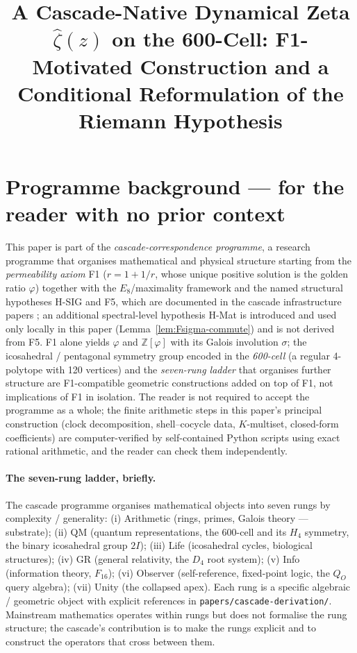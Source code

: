 \documentclass[11pt, a4paper]{amsart}
\title{A Cascade-Native Dynamical Zeta $\widehat\zeta(z)$ on the 600-Cell: F1-Motivated Construction and a Conditional Reformulation of the Riemann Hypothesis}
\author{}
\date{}
\theoremstyle{definition}
\begin{document}
\maketitle

\section*{Programme background — for the reader with no prior context}

This paper is part of the \emph{cascade-correspondence programme},
a research programme that organises mathematical and physical
structure starting from the \emph{permeability axiom} F1
($r = 1 + 1/r$, whose unique positive solution is the golden ratio
$\varphi$) together with the $E_8$/maximality framework and the
named structural hypotheses H-SIG and F5, which are documented in
the cascade infrastructure papers
\cite{CascadeFoundations,PaperXXXVI}; an additional spectral-level
hypothesis H-Mat is introduced and used only locally in this paper
(Lemma~\ref{lem:Fsigma-commute}) and is not derived from F5.  F1 alone yields $\varphi$
and $\mathbb{Z}[\varphi]$ with its Galois involution $\sigma$; the
icosahedral / pentagonal symmetry group encoded in the
\emph{600-cell} (a regular 4-polytope with 120 vertices) and the
\emph{seven-rung ladder} that organises further structure are
F1-compatible geometric constructions added on top of F1, not
implications of F1 in isolation. The reader is not required to accept the
programme as a whole; the finite arithmetic steps in this paper's
principal construction (clock decomposition, shell--cocycle data,
$K$-multiset, closed-form coefficients) are computer-verified by
self-contained Python scripts using exact rational arithmetic, and
the reader can check them independently.

\paragraph{The seven-rung ladder, briefly.}
The cascade programme organises mathematical objects into seven
rungs by complexity / generality: (i) Arithmetic (rings, primes,
Galois theory — substrate); (ii) QM (quantum representations,
the 600-cell and its $H_4$ symmetry, the binary icosahedral group
$2I$); (iii) Life (icosahedral cycles, biological structures);
(iv) GR (general relativity, the $D_4$ root system); (v) Info
(information theory, $F_{16}$); (vi) Observer (self-reference,
fixed-point logic, the $Q_O$ query algebra); (vii) Unity (the
collapsed apex). Each rung is a specific algebraic / geometric
object with explicit references in
\texttt{papers/cascade-derivation/}. Mainstream mathematics
operates within rungs but does not formalise the rung structure;
the cascade's contribution is to make the rungs explicit and to
construct the operators that cross between them.
\end{document}

